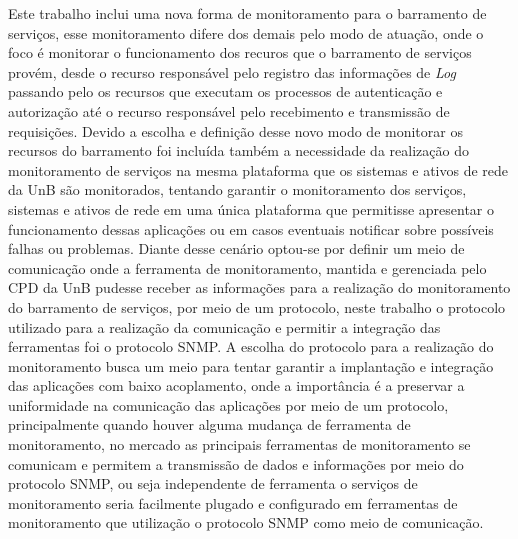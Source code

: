 Este trabalho inclui uma nova forma de monitoramento para o barramento de serviços, esse monitoramento difere dos demais pelo modo de atuação, onde o foco é monitorar o funcionamento dos recuros que o barramento de serviços provém, desde o recurso responsável pelo registro das informações de \textit{Log} passando pelo os recursos que executam os processos de autenticação e autorização até o recurso responsável pelo recebimento e transmissão de requisições. Devido a escolha e definição desse novo modo de monitorar os recursos do barramento foi incluída também a necessidade da realização do monitoramento de serviços na mesma plataforma que os sistemas e ativos de rede da \acrshort{UnB} são monitorados, tentando garantir o monitoramento dos serviços, sistemas e ativos de rede em uma única plataforma que permitisse apresentar o funcionamento dessas aplicações ou em casos eventuais notificar sobre possíveis falhas ou problemas. Diante desse cenário optou-se por definir um meio de comunicação onde a ferramenta de monitoramento, mantida e gerenciada pelo \acrshort{CPD} da \acrshort{UnB} pudesse receber as informações para a realização do monitoramento do barramento de serviços, por meio de um protocolo, neste trabalho o protocolo utilizado para a realização da comunicação e permitir a integração das ferramentas foi o protocolo \acrshort{SNMP}. A escolha do protocolo para a realização do monitoramento busca um meio para tentar garantir a implantação e integração das aplicações com baixo acoplamento, onde a importância é a preservar a uniformidade na comunicação das aplicações por meio de um protocolo, principalmente quando houver alguma mudança de ferramenta de monitoramento, no mercado as principais ferramentas de monitoramento se comunicam e permitem a transmissão de dados e informações por meio do protocolo \acrshort{SNMP}, ou seja independente de ferramenta o serviços de monitoramento seria facilmente plugado e configurado em ferramentas de monitoramento que utilização o protocolo \acrshort{SNMP} como meio de comunicação.      

